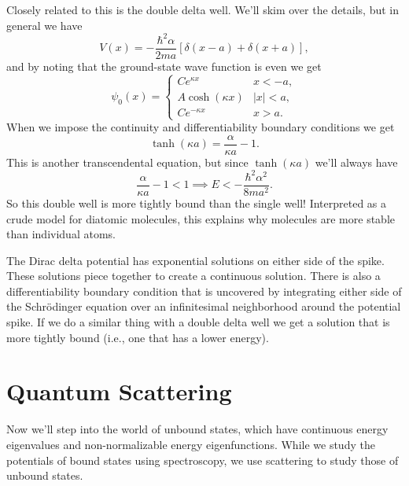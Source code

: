 \documentclass[../p052main.tex]{subfiles}
\begin{document}
Closely related to this is the double delta well.
We'll skim over the details, but in general we have
\[ V(x) = -\frac{\hbar^2 \alpha}{2ma} \left[ \delta (x-a) + \delta (x+a) \right], \]
and by noting that the ground-state wave function is even we get
\[ \psi_0(x) = \begin{cases} Ce^{\kappa x} & x < -a, \\ A \cosh (\kappa x) & |x| < a, \\ Ce^{-\kappa x} & x > a. \end{cases} \]
When we impose the continuity and differentiability boundary conditions we get
\[ \tanh (\kappa a) = \frac{\alpha}{\kappa a} - 1. \]
This is another transcendental equation, but since $\tanh (\kappa a)$ we'll always have
\[ \frac{\alpha}{\kappa a} - 1 < 1 \implies E < -\frac{\hbar^2 \alpha^2}{8ma^2}. \]
So this double well is more tightly bound than the single well!
Interpreted as a crude model for diatomic molecules, this explains why molecules are more stable than individual atoms.

\begin{summary}
    The Dirac delta potential has exponential solutions on either side of the spike.
    These solutions piece together to create a continuous solution.
    There is also a differentiability boundary condition that is uncovered by integrating either side of the Schrödinger equation over an infinitesimal neighborhood around the potential spike.
    If we do a similar thing with a double delta well we get a solution that is more tightly bound (i.e., one that has a lower energy).
\end{summary}

\section{Quantum Scattering}
Now we'll step into the world of unbound states, which have continuous energy eigenvalues and non-normalizable energy eigenfunctions.
While we study the potentials of bound states using spectroscopy, we use scattering to study those of unbound states.
\end{document}
